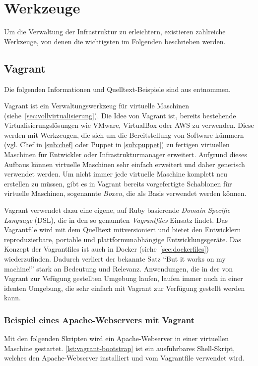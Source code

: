 \section{Werkzeuge}
\label{sec:konfigurationswerkzeuge}
Um die Verwaltung der Infrastruktur zu erleichtern, existieren zahlreiche Werkzeuge, von denen die wichtigsten im Folgenden beschrieben werden.

\subsection{Vagrant}
\label{sub:vagrant}
Die folgenden Informationen und Quelltext-Beispiele sind aus \autocite{Vagrant:online} entnommen.

Vagrant ist ein Verwaltungswerkzeug für virtuelle Maschinen (siehe~\cref{sec:vollvirtualisierung}).
Die Idee von Vagrant ist, bereits bestehende Virtualisierungslösungen wie VMware, VirtualBox oder AWS zu verwenden.
Diese werden mit Werkzeugen, die sich um die Bereitstellung von Software kümmern (vgl. Chef in \cref{sub:chef} oder Puppet in \cref{sub:puppet}) zu fertigen virtuellen Maschinen für Entwickler oder Infrastrukturmanager erweitert.
Aufgrund dieses Aufbaus können virtuelle Maschinen sehr einfach erweitert und daher generisch verwendet werden.
Um nicht immer jede virtuelle Maschine komplett neu erstellen zu müssen, gibt es in Vagrant bereits vorgefertigte Schablonen für virtuelle Maschinen, sogenannte \emph{Boxen}, die als Basis verwendet werden können.

Vagrant verwendet dazu eine eigene, auf Ruby basierende \emph{Domain Specific Language} (DSL), die in den so genannten \emph{Vagrantfiles} Einsatz findet.
Das Vagrantfile wird mit dem Quelltext mitversioniert und bietet den Entwicklern reproduzierbare, portable und plattformunabhängige Entwicklungsgeräte.
Das Konzept der Vagrantfiles ist auch in Docker (siehe~\cref{sec:dockerfiles}) wiederzufinden.
Dadurch verliert der bekannte Satz ``But it works on my machine!'' stark an Bedeutung und Relevanz.
Anwendungen, die in der von Vagrant zur Vefügung gestellten Umgebung laufen, laufen immer auch in einer identen Umgebung, die sehr einfach mit Vagrant zur Verfügung gestellt werden kann.

\subsubsection{Beispiel eines Apache-Webservers mit Vagrant}
Mit den folgenden Skripten wird ein Apache-Webserver in einer virtuellen Maschine gestartet.
\cref{lst:vagrant-bootstrap} ist ein ausführbares Shell-Skript, welches den Apache-Webserver installiert und vom Vagrantfile verwendet wird.

